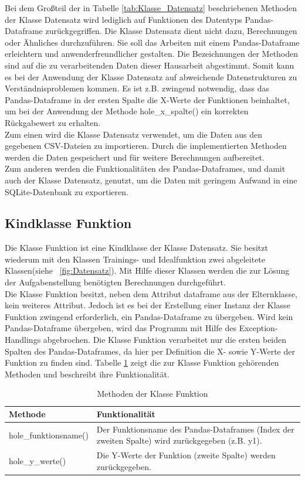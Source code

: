 \documentclass[11pt,a4paper]{scrreprt}
\newcommand{\abbildung}[1]{\figurename\ \ref{#1}}
\begin{document}
Bei dem Großteil der in Tabelle \ref{tab:Klasse_Datensatz} beschriebenen Methoden der Klasse Datensatz wird lediglich auf Funktionen des Datentyps Pandas-Dataframe zurückgegriffen. Die Klasse Datensatz dient nicht dazu, Berechnungen oder Ähnliches durchzuführen. Sie soll das Arbeiten mit einem Pandas-Dataframe erleichtern und anwenderfreundlicher gestalten. Die Bezeichnungen der Methoden sind auf die zu verarbeitenden Daten dieser Hausarbeit abgestimmt. Somit kann es bei der Anwendung der Klasse Datensatz auf abweichende Datenstrukturen zu Verständnisproblemen kommen. Es ist z.B. zwingend notwendig, dass das Pandas-Dataframe in der ersten Spalte die X-Werte der Funktionen beinhaltet, um bei der Anwendung der Methode hole\_x\_spalte() ein korrekten Rückgabewert zu erhalten.\\
Zum einen wird die Klasse Datensatz verwendet, um die Daten aus den gegebenen CSV-Dateien zu importieren. Durch die implementierten Methoden werden die Daten gespeichert und für weitere Berechnungen aufbereitet. \\
Zum anderen werden die Funktionalitäten des Pandas-Dataframes, und damit auch der Klasse Datensatz, genutzt, um die Daten mit geringem Aufwand in eine SQLite-Datenbank zu exportieren. 

\subsection{Kindklasse Funktion}
\label{sub:Funktion}
Die Klasse Funktion ist eine Kindklasse der Klasse Datensatz. Sie besitzt wiederum mit den Klassen Trainings- und Idealfunktion zwei abgeleitete Klassen(siehe \abbildung{fig:Datensatz}). Mit Hilfe dieser Klassen werden die zur Lösung der Aufgabenstellung benötigten Berechnungen durchgeführt. \\
Die Klasse Funktion besitzt, neben dem Attribut dataframe aus der Elternklasse, kein weiteres Attribut. Jedoch ist es bei der Erstellung einer Instanz der Klasse Funktion zwingend erforderlich, ein Pandas-Dataframe zu übergeben. Wird kein Pandas-Dataframe übergeben, wird das Programm mit Hilfe des Exception-Handlings abgebrochen. Die Klasse Funktion verarbeitet nur die ersten beiden Spalten des Pandas-Dataframes, da hier per Definition die X- sowie Y-Werte der Funktion zu finden sind. Tabelle \ref{tab:Klasse_Funktion} zeigt die zur Klasse Funktion gehörenden Methoden und beschreibt ihre Funktionalität. 

\begin{table}[!h]
\centering
\begin{tabularx}{0.95\textwidth}{|l|X|}
\hline
\textbf{Methode} & \textbf{Funktionalität}\\
\hline
hole\_funktionsname() & Der Funktionsname des Pandas-Dataframes (Index der zweiten Spalte) wird zurückgegeben (z.B. y1).\\
\hline
hole\_y\_werte() & Die Y-Werte der Funktion (zweite Spalte) werden zurückgegeben.\\
\hline
\end{tabularx}
\caption{Methoden der Klasse Funktion}
\label{tab:Klasse_Funktion}
\end{table}
\end{document}
